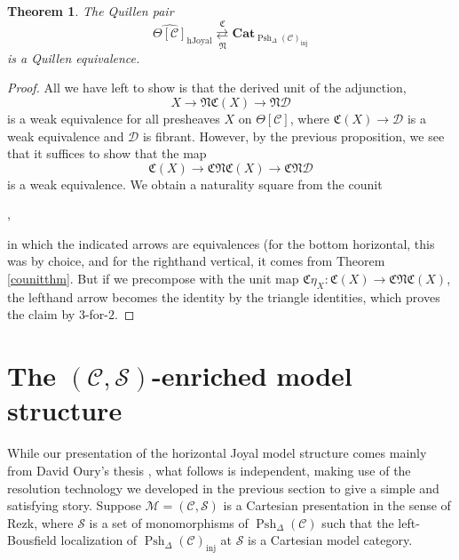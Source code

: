 \documentclass{amsart}
\numberwithin{equation}{section}
\theoremstyle{plain}   %
\newtheorem{thm}[subsection]{Theorem}
\theoremstyle{remark}
\theoremstyle{plain}
\newcommand{\Cat}{\ensuremath{\mathbf{Cat}}}
\newcommand{\C}{\ensuremath{\mathcal{C}}}
\newcommand{\M}{\ensuremath{\mathcal{M}}}
\newcommand{\setS}{\ensuremath{\mathscr{S}}}
\newcommand{\cellset}{\ensuremath{\widehat{\Theta[\mathcal{C}]}}}
\newcommand{\spsh}{\ensuremath{\operatorname{Psh}_\Delta(\mathcal{C})}}
\begin{document}
\begin{thm}\label{mainthm1}
	The Quillen pair
	\[\cellset_{\mathrm{hJoyal}} \underset{\mathfrak{N}}{\overset{\mathfrak{C}}{\rightleftarrows}} \Cat_{\spsh_{\mathrm{inj}}}\]
	is a Quillen equivalence.
\end{thm}
\begin{proof}
	All we have left to show is that the derived unit of the adjunction,
	\[X\to \mathfrak{N}\mathfrak{C}(X) \to \mathfrak{N}\mathcal{D}\]
	is a weak equivalence for all presheaves \(X\) on \(\Theta[\C]\), where \(\mathfrak{C}(X) \to \mathcal{D}\) is a weak equivalence and \(\mathcal{D}\) is fibrant.  However, by the previous proposition, we see that it suffices to show that the map
	\[\mathfrak{C}(X)\to \mathfrak{C}\mathfrak{N}\mathfrak{C}(X) \to \mathfrak{C}\mathfrak{N}\mathcal{D}\]
	is a weak equivalence.  We obtain a naturality square from the counit
	\begin{center}
		,
	\end{center}
	in which the indicated arrows are equivalences (for the bottom horizontal, this was by choice, and for the righthand vertical, it comes from Theorem \ref{counitthm}.  But if we precompose with the unit map \(\mathfrak{C}\eta_X:\mathfrak{C}(X)\to \mathfrak{C}\mathfrak{N}\mathfrak{C}(X)\), the lefthand arrow becomes the identity by the triangle identities, which proves the claim by \(3\)-for-\(2\).
\end{proof}

\section{The \((\C,\setS)\)-enriched model structure}\label{rezkvert}
While our presentation of the horizontal Joyal model structure comes mainly from David Oury's thesis \cite{oury}, what follows is independent, making use of the resolution technology we developed in the previous section to give a simple and satisfying story. Suppose \(\M=(\C,\setS)\) is a Cartesian presentation in the sense of Rezk, where \(\setS\) is a set of monomorphisms of \(\spsh\) such that the left-Bousfield localization of \(\spsh_\mathrm{inj}\) at \(\setS\) is a Cartesian model category.  
\end{document}
